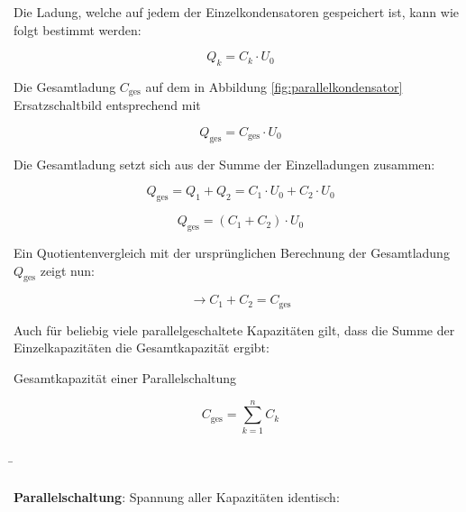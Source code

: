\begin{frame}
{		Die Ladung, welche auf jedem der Einzelkondensatoren gespeichert ist, kann wie folgt bestimmt werden:

		\begin{equation*}
			Q_k = C_k \cdot U_0
		\end{equation*}

		Die Gesamtladung $C_\mathrm{ges}$ auf dem in Abbildung \ref{fig:parallelkondensator} Ersatzschaltbild entsprechend mit

		\begin{equation*}
			Q_\mathrm{ges} = C_\mathrm{ges} \cdot U_0
		\end{equation*}

		Die Gesamtladung setzt sich aus der Summe der Einzelladungen zusammen:


		\begin{equation*}
			Q_\mathrm{ges} = Q_1 + Q_2 = C_1 \cdot U_0 + C_2 \cdot U_0
		\end{equation*}



		\begin{equation*}
			Q_\mathrm{ges} =  (C_1 + C_2) \cdot U_0
		\end{equation*}

		Ein Quotientenvergleich mit der ursprünglichen Berechnung der Gesamtladung $Q_\mathrm{ges}$ zeigt nun:



		\begin{equation*}
			\rightarrow C_1 + C_2 = C_\mathrm{ges}
		\end{equation*}

		Auch für beliebig viele parallelgeschaltete Kapazitäten gilt, dass die Summe der Einzelkapazitäten die Gesamtkapazität ergibt:


		\begin{Merksatz}{Gesamtkapazität einer Parallelschaltung}

			\begin{equation*}
				C_\mathrm{ges} = \sum_{k=1}^{n} C_k
			\end{equation*}

		\end{Merksatz}

	}



	\b{
		\begin{columns}
			\vspace*{-110pt}

			\textbf{Parallelschaltung}: Spannung aller Kapazitäten identisch: \\


\end{columns}}
\end{frame}
